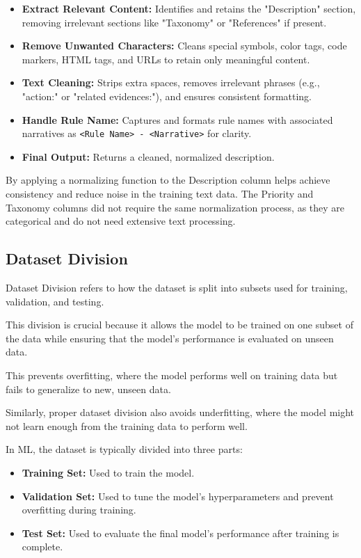 \begin{itemize}
    \item \textbf{Extract Relevant Content:} Identifies and retains the "Description" section, removing irrelevant sections like "Taxonomy" or "References" if present.
    \item \textbf{Remove Unwanted Characters:} Cleans special symbols, color tags, code markers, HTML tags, and URLs to retain only meaningful content.
    \item \textbf{Text Cleaning:} Strips extra spaces, removes irrelevant phrases (e.g., "action:" or "related evidences:"), and ensures consistent formatting.
    \item \textbf{Handle Rule Name:} Captures and formats rule names with associated narratives as \texttt{<Rule Name> - <Narrative>} for clarity.
    \item \textbf{Final Output:} Returns a cleaned, normalized description.
\end{itemize}

By applying a normalizing function to the Description column helps achieve consistency and reduce noise in the training text data.
The Priority and Taxonomy columns did not require the same normalization process, as they are categorical and do not need extensive text processing.

\subsection{Dataset Division}
Dataset Division refers to how the dataset is split into subsets used for training, validation, and testing. 

This division is crucial because it allows the model to be trained on one subset of the data while ensuring that the model's performance is evaluated on unseen data. 

This prevents overfitting, where the model performs well on training data but fails to generalize to new, unseen data. 

Similarly, proper dataset division also avoids underfitting, where the model might not learn enough from the training data to perform well.

In ML, the dataset is typically divided into three parts:
\begin{itemize}
    \item \textbf{Training Set:} Used to train the model.
    \item \textbf{Validation Set:} Used to tune the model's hyperparameters and prevent overfitting during training.
    \item \textbf{Test Set:} Used to evaluate the final model's performance after training is complete.
\end{itemize}

